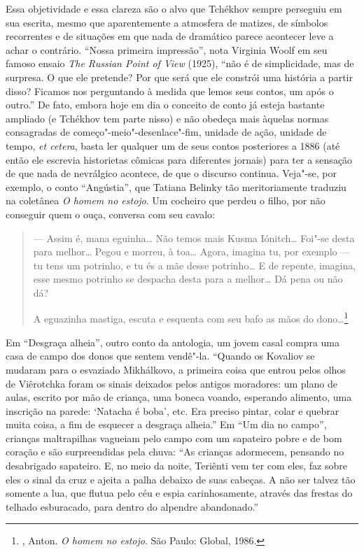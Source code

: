 Essa objetividade e essa clareza são o alvo que Tchékhov sempre
perseguiu em sua escrita, mesmo que aparentemente a atmosfera de
matizes, de símbolos recorrentes e de situações em que nada de
dramático parece acontecer leve a achar o contrário. ``Nossa
primeira impressão'', nota Virginia Woolf em seu famoso ensaio
\emph{The Russian Point of View} (1925), ``não é de simplicidade,
mas de surpresa. O que ele pretende? Por que será que ele constrói
uma história a partir disso? Ficamos nos perguntando à medida que
lemos seus contos, um após o outro.'' De fato, embora hoje em dia
o conceito de conto já esteja bastante ampliado (e
Tchékhov tem parte nisso) e não obedeça mais àquelas normas
consagradas de começo"-meio"-desenlace"-fim, unidade de ação,
unidade de tempo, \emph{et cetera}, basta ler qualquer um de
seus contos posteriores a 1886 (até então ele escrevia historietas
cômicas para diferentes jornais) para ter a sensação de que nada
de nevrálgico acontece, de que o discurso continua. Veja"-se, por
exemplo, o conto ``Angústia'', que Tatiana Belinky tão meritoriamente
traduziu na coletânea \emph{O homem no estojo}. Um cocheiro que
perdeu o filho, por não conseguir quem o ouça, conversa com seu
cavalo: 

\begin{quotation}
--- Assim é, mana eguinha\ldots{} Não temos mais Kusma
Iónitch\ldots{} Foi"-se desta para melhor\ldots{} Pegou e morreu,
à toa\ldots{} Agora, imagina tu, por exemplo --- tu tens um
potrinho, e tu és a mãe desse potrinho\ldots{} E de repente,
imagina, esse mesmo potrinho se despacha desta para a melhor\ldots{}
Dá pena ou não dá?

A eguazinha mastiga, escuta e esquenta com seu bafo as mãos do
dono\ldots{}\footnote{, Anton. \emph{O homem no
estojo}. São Paulo: Global, 1986.}
\end{quotation}

Em ``Desgraça alheia'', outro conto da antologia, um jovem casal
compra uma casa de campo dos donos que sentem vendê"-la. ``Quando
os Kovaliov se mudaram para o esvaziado Mikhálkovo, a primeira
coisa que entrou pelos olhos de Viêrotchka foram os sinais
deixados pelos antigos moradores: um plano de aulas, escrito por
mão de criança, uma boneca voando, esperando alimento, uma
inscrição na parede: `Natacha é boba', etc. Era preciso pintar,
colar e quebrar muita coisa, a fim de esquecer a desgraça alheia.''
Em ``Um dia no campo'', crianças maltrapilhas vagueiam pelo campo
com um sapateiro pobre e de bom coração e são surpreendidas pela
chuva: ``As crianças adormecem, pensando no desabrigado sapateiro.
E, no meio da noite, Teriênti vem ter com eles, faz sobre eles o
sinal da cruz e ajeita a palha debaixo de suas cabeças. A não ser
talvez tão somente a lua, que flutua pelo céu e espia carinhosamente,
através das frestas do telhado esburacado, para dentro do alpendre
abandonado.''

